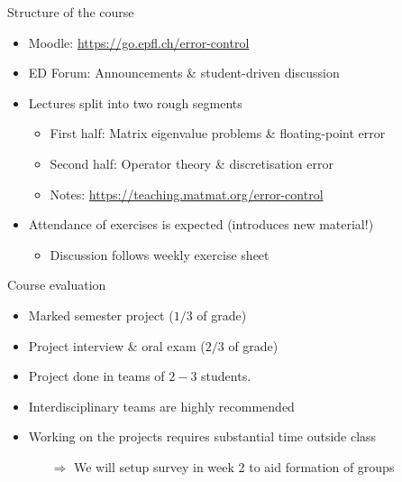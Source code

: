 \begin{frame}{Structure of the course}
    \begin{itemize}
        \item \alert{Moodle:} \url{https://go.epfl.ch/error-control}
        \vspace{-0.3em}
    \item \alert{ED Forum:} Announcements \& \alert{student-driven} discussion
        \vspace{1.0em}
        \item Lectures split into two rough segments
            \begin{itemize}
                \vspace{-0.3em}
                \item \alert{First half:} Matrix eigenvalue problems \& floating-point error
                \vspace{-0.3em}
                \item \alert{Second half:} Operator theory \& discretisation error
                \vspace{-0.3em}
                \item \alert{Notes:} \url{https://teaching.matmat.org/error-control}
            \end{itemize}
        \vspace{1.0em}
        \item Attendance of exercises is \alert{expected} \textcolor{grey5}{(introduces new material!)}
            \begin{itemize}
                \vspace{-0.3em}
                \item Discussion follows weekly exercise sheet
            \end{itemize}
    \end{itemize}
\end{frame}
\begin{frame}{Course evaluation}
    \begin{itemize}
        \item Marked semester project \textcolor{grey5}{($1/3$ of grade)}
        \item Project interview \& oral exam \textcolor{grey5}{($2/3$ of grade)}
        \item Project done in \alert{teams of $2-3$ students}.
        \item Interdisciplinary teams are highly recommended
        \vspace{1.5em}
        \item Working on the projects
            \alert{requires substantial time outside class}
            \begin{itemize}
                \vspace{-0.3em}
            \item[$\Rightarrow$] We will setup \alert{survey} in week 2 to \alert{aid formation of groups}
            \end{itemize}
    \end{itemize}
\end{frame}

